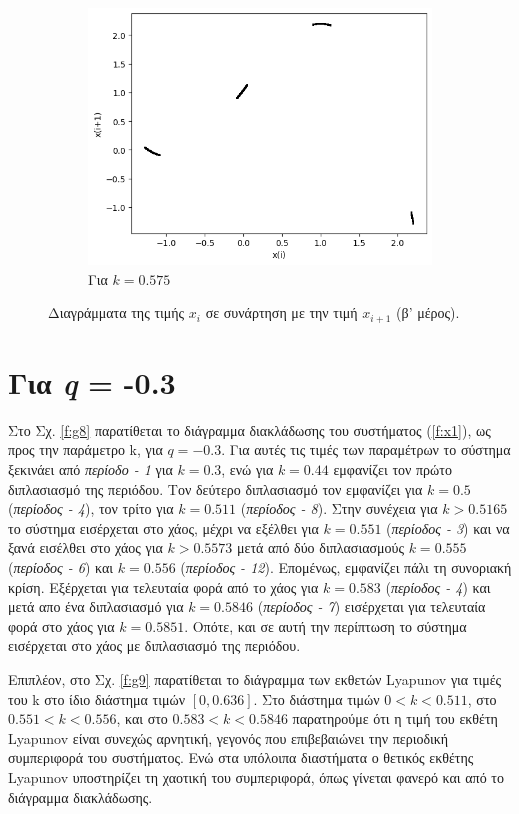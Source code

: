 \begin{figure}[ht]
\begin{subfigure}[c]{0.4\textwidth}
		\includegraphics[width=\textwidth]{LateX images/graphs/k0575}
		\caption{Για $k=0.575$}
		\label{f:k14}
	\end{subfigure}
	\caption{Διαγράμματα της τιμής \(x_i\) σε συνάρτηση με την τιμή \(x_{i+1}\) (β' μέρος).}
\end{figure}
\vfill
\clearpage
\newpage
\section{Για \emph{q} = -0.3}

Στο Σχ. \ref{f:g8} παρατίθεται το διάγραμμα διακλάδωσης του συστήματος (\ref{f:x1}), ως προς την παράμετρο k, για $q =-0.3$. Για αυτές τις τιμές των παραμέτρων το σύστημα ξεκινάει από \emph{περίοδο - 1} για $k=0.3$, ενώ για  $k = 0.44$ εμφανίζει τον πρώτο διπλασιασμό της περιόδου. Τον δεύτερο διπλασιασμό τον εμφανίζει για $k=0.5$ (\emph{περίοδος -   4}), τον τρίτο για $k=0.511$ (\emph{περίοδος -   8}). Στην συνέχεια για $k>0.5165$ το σύστημα εισέρχεται στο χάος, μέχρι να εξέλθει  για $k=0.551$ (\emph{περίοδος -   3}) και να ξανά εισέλθει στο χάος για $k>0.5573$ μετά από δύο διπλασιασμούς $k=0.555$ (\emph{περίοδος - 6}) και $k=0.556$ (\emph{περίοδος - 12}). Επομένως, εμφανίζει πάλι τη συνοριακή κρίση. Εξέρχεται για τελευταία φορά από το χάος για $k=0.583$ (\emph{περίοδος - 4}) και μετά απο ένα διπλασιασμό  για $k=0.5846$ (\emph{περίοδος - 7}) εισέρχεται για τελευταία φορά στο χάος για $k=0.5851$. Οπότε, και σε αυτή την περίπτωση το σύστημα εισέρχεται στο χάος με διπλασιασμό της περιόδου. 

Επιπλέον, στο Σχ. \ref{f:g9} παρατίθεται το διάγραμμα των εκθετών Lyapunov για τιμές του k στο ίδιο διάστημα τιμών $[0, 0.636]$. Στο διάστημα τιμών $0<k<0.511$, στο $0.551<k<0.556$, και στο $0.583<k<0.5846$ παρατηρούμε ότι η τιμή του εκθέτη Lyapunov είναι συνεχώς αρνητική, γεγονός που επιβεβαιώνει την περιοδική συμπεριφορά του συστήματος. Ενώ στα υπόλοιπα διαστήματα ο θετικός εκθέτης Lyapunov υποστηρίζει τη χαοτική του συμπεριφορά, όπως γίνεται φανερό και από το διάγραμμα διακλάδωσης.

